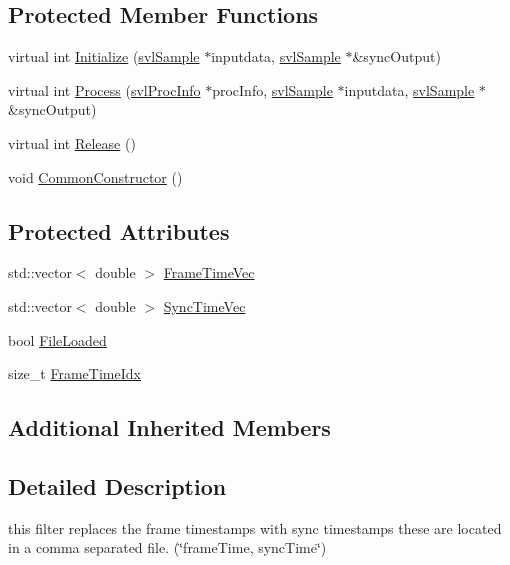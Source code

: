 \subsection*{Protected Member Functions}
\begin{DoxyCompactItemize}
\item 
virtual int \hyperlink{classsvl_filter_frame_time_sync_a0ee91b83ada751d3c4f60d17924a83b0}{Initialize} (\hyperlink{classsvl_sample}{svl\-Sample} $\ast$inputdata, \hyperlink{classsvl_sample}{svl\-Sample} $\ast$\&sync\-Output)
\item 
virtual int \hyperlink{classsvl_filter_frame_time_sync_a1708a14f9994aa0d0e6aeee26d171b10}{Process} (\hyperlink{structsvl_proc_info}{svl\-Proc\-Info} $\ast$proc\-Info, \hyperlink{classsvl_sample}{svl\-Sample} $\ast$inputdata, \hyperlink{classsvl_sample}{svl\-Sample} $\ast$\&sync\-Output)
\item 
virtual int \hyperlink{classsvl_filter_frame_time_sync_a4d156b358adfc87174af51cd32bdc3e6}{Release} ()
\item 
void \hyperlink{classsvl_filter_frame_time_sync_adaa84f1ae10e63da47c886f585251406}{Common\-Constructor} ()
\end{DoxyCompactItemize}
\subsection*{Protected Attributes}
\begin{DoxyCompactItemize}
\item 
std\-::vector$<$ double $>$ \hyperlink{classsvl_filter_frame_time_sync_a7bf99c445800fe0e23a70eba6bd93f3d}{Frame\-Time\-Vec}
\item 
std\-::vector$<$ double $>$ \hyperlink{classsvl_filter_frame_time_sync_a4d5d8201aa1a99de2559bc304ad54678}{Sync\-Time\-Vec}
\item 
bool \hyperlink{classsvl_filter_frame_time_sync_a59978f199103c4f72dd7622029cd290a}{File\-Loaded}
\item 
size\-\_\-t \hyperlink{classsvl_filter_frame_time_sync_a514b0c86986cec46d63d12ca68854842}{Frame\-Time\-Idx}
\end{DoxyCompactItemize}
\subsection*{Additional Inherited Members}


\subsection{Detailed Description}
this filter replaces the frame timestamps with sync timestamps these are located in a comma separated file. (\char`\"{}frame\-Time, sync\-Time\char`\"{}) 


